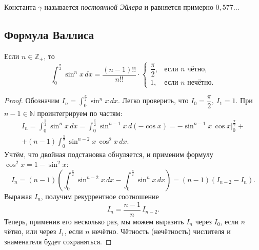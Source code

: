 \begin{remark}
	Константа \(\gamma\) называется \textit{постоянной Эйлера} и равняется примерно \(0,577\ldots\)
\end{remark}

\subsection{Формула Валлиса}

\hypertarget{vallem}{}
\begin{lemma}
	Если \(n \in \mathbb{Z}_+\), то \[
	\int_0^{\frac{\pi}{2}} \sin^n x \, dx = \frac{(n - 1)!!}{n!!} \cdot
	\begin{cases}
		\dfrac{\pi}{2}, &\text{если \(n\) чётно}, \\
		1, 				&\text{если \(n\) нечётно}.
	\end{cases}
	\]
\end{lemma}

\begin{proof}
	Обозначим \(I_n = \displaystyle\int_0^{\frac{\pi}{2}} \sin^n x \, dx\). Легко проверить, что \(I_0 = \dfrac{\pi}{2}, \ I_1 = 1\). При \(n - 1 \in \mathbb{N}\) проинтегрируем по частям:
	\begin{multline*}
		I_n = \int_0^{\frac{\pi}{2}} \sin^n x \, dx = \int_0^{\frac{\pi}{2}} \sin^{n - 1} x \, d(-\cos x) = -\sin^{n - 1} x \, \cos x \bigg|_0^{\frac{\pi}{2}} + \\ 
		+ (n - 1) \int_0^\frac{\pi}{2} \sin^{n - 2} x \, \cos^2 x \, dx.
	\end{multline*}
	Учтём, что двойная подстановка обнуляется, и применим формулу \(\cos^2 x = 1 - \sin^2 x\): \[
		I_n = (n - 1) \left(\int_0^\frac{\pi}{2} \sin^{n - 2} x \, dx - \int_0^\frac{\pi}{2} \sin^n x \, dx \right) = (n - 1) (I_{n - 2} - I_n).
	\]
	Выражая \(I_n\), получим рекуррентное соотношение \[
	I_n = \frac{n - 1}{n} \, I_{n - 2}.
	\]
	Теперь, применив его несколько раз, мы можем выразить \(I_n\) через \(I_0\), если \(n\) чётно, или через \(I_1\), если \(n\) нечётно. Чётность (нечётность) числителя и знаменателя будет сохраняться.
\end{proof}

